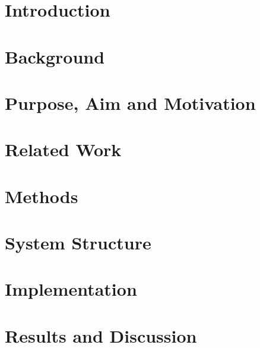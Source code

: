 \documentclass[12pt]{article}
\begin{document}
\begin{abstract}
  
\end{abstract}
\pagebreak

\section{Introduction} %
\label{sec:introduction}
  

\section{Background} %
\label{sec:background}
  

\section{Purpose, Aim and Motivation}
\label{sec:purpose}
  

\section{Related Work}
\label{sec:relatedwork}
   

\section{Methods} %
\label{sec:methods}
  

\section{System Structure}
\label{sec:systemstructure}
  

\section{Implementation}
\label{sec:implementation}
  

\section{Results and Discussion} %
\label{sec:results_and_discussion}
  
\end{document}

